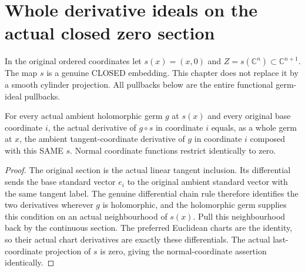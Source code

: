 \chapter{Whole derivative ideals on the actual closed zero section}

In the original ordered coordinates let $s(x)=(x,0)$ and $Z=s(\mathbb C^n)\subset\mathbb C^{n+1}$. The map $s$ is a genuine CLOSED embedding. This chapter does not replace it by a smooth cylinder projection. All pullbacks below are the entire functional germ-ideal pullbacks.

\begin{lemma}
\label{hir:actual-zero-section-tangent-derivatives}
\leanok
For every actual ambient holomorphic germ $g$ at $s(x)$ and every original base coordinate $i$, the actual derivative of $g\circ s$ in coordinate $i$ equals, as a whole germ at $x$, the ambient tangent-coordinate derivative of $g$ in coordinate $i$ composed with this SAME $s$. Normal coordinate functions restrict identically to zero.
\end{lemma}
\begin{proof}
The original section is the actual linear tangent inclusion. Its differential sends the base standard vector $e_i$ to the original ambient standard vector with the same tangent label. The genuine differential chain rule therefore identifies the two derivatives wherever $g$ is holomorphic, and the holomorphic germ supplies this condition on an actual neighbourhood of $s(x)$. Pull this neighbourhood back by the continuous section. The preferred Euclidean charts are the identity, so their actual chart derivatives are exactly these differentials. The actual last-coordinate projection of $s$ is zero, giving the normal-coordinate assertion identically.
\end{proof}

